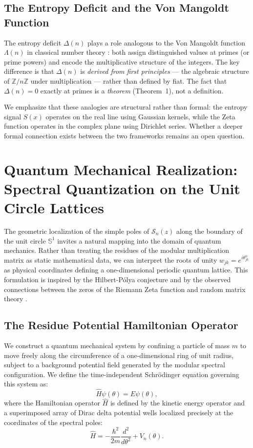\documentclass[11pt,twoside]{article}
\begin{document}
	\subsection{The Entropy Deficit and the Von Mangoldt Function}
	The entropy deficit $\Delta(n)$ plays a role analogous to the Von Mangoldt function $\Lambda(n)$ in classical number theory \cite{ireland_rosen}: both assign distinguished values at primes (or prime powers) and encode the multiplicative structure of the integers. The key difference is that $\Delta(n)$ is \emph{derived from first principles} — the algebraic structure of $\mathbb{Z}/n\mathbb{Z}$ under multiplication — rather than defined by fiat. The fact that $\Delta(n) = 0$ exactly at primes is a \emph{theorem} (Theorem~1), not a definition.
	
	We emphasize that these analogies are structural rather than formal: the entropy signal $S(x)$ operates on the real line using Gaussian kernels, while the Zeta function operates in the complex plane using Dirichlet series. Whether a deeper formal connection exists between the two frameworks remains an open question.
	
	\section{Quantum Mechanical Realization: Spectral Quantization on the Unit Circle Lattices}
	
	The geometric localization of the simple poles of $\mathcal{S}_n(z)$ along the boundary of the unit circle $\mathbb{S}^1$ invites a natural mapping into the domain of quantum mechanics. Rather than treating the residues of the modular multiplication matrix as static mathematical data, we can interpret the roots of unity $w_{jk} = e^{i\theta^{n}_{jk}}$ as physical coordinates defining a one-dimensional periodic quantum lattice. This formulation is inspired by the Hilbert-P\'{o}lya conjecture \cite{berry_keating} and by the observed connections between the zeros of the Riemann Zeta function and random matrix theory \cite{montgomery1973, keating_snaith}.
	
	\subsection{The Residue Potential Hamiltonian Operator}
	We construct a quantum mechanical system by confining a particle of mass $m$ to move freely along the circumference of a one-dimensional ring of unit radius, subject to a background potential field generated by the modular spectral configuration. We define the time-independent Schrödinger equation governing this system as:
	\begin{equation}
		\hat{H} \psi(\theta) = E \psi(\theta),
	\end{equation}
	where the Hamiltonian operator $\hat{H}$ is defined by the kinetic energy operator and a superimposed array of Dirac delta potential wells localized precisely at the coordinates of the spectral poles:
	\begin{equation}
		\hat{H} = -\frac{\hbar^2}{2m} \frac{d^2}{d\theta^2} + V_n(\theta).
	\end{equation}
	
\end{document}
